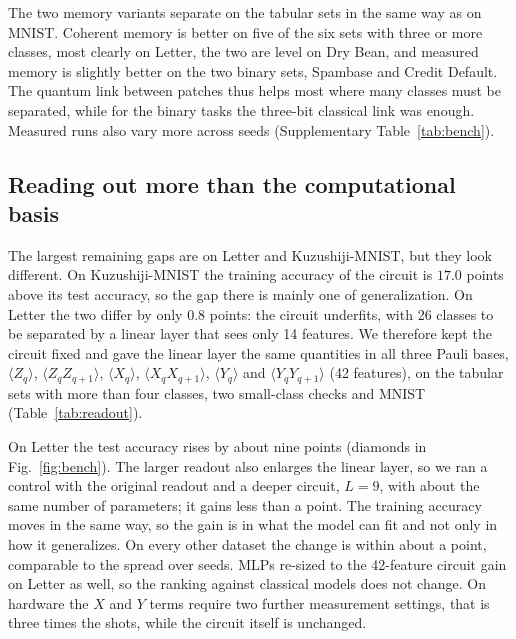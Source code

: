 \documentclass[11pt]{article}
\begin{document}
The two memory variants separate on the tabular sets in the same way as on MNIST. Coherent memory is better on five of the six sets with three or more classes, most clearly on Letter, the two are level on Dry Bean, and measured memory is slightly better on the two binary sets, Spambase and Credit Default. The quantum link between patches thus helps most where many classes must be separated, while for the binary tasks the three-bit classical link was enough. Measured runs also vary more across seeds (Supplementary Table~\ref{tab:bench}).

\subsection{Reading out more than the computational basis}
\label{sec:res-readout}

The largest remaining gaps are on Letter and Kuzushiji-MNIST, but they look different. On Kuzushiji-MNIST the training accuracy of the circuit is $17.0$ points above its test accuracy, so the gap there is mainly one of generalization. On Letter the two differ by only $0.8$ points: the circuit underfits, with 26 classes to be separated by a linear layer that sees only 14 features. We therefore kept the circuit fixed and gave the linear layer the same quantities in all three Pauli bases, $\langle Z_q\rangle$, $\langle Z_qZ_{q+1}\rangle$, $\langle X_q\rangle$, $\langle X_qX_{q+1}\rangle$, $\langle Y_q\rangle$ and $\langle Y_qY_{q+1}\rangle$ (42 features), on the tabular sets with more than four classes, two small-class checks and MNIST (Table~\ref{tab:readout}).

On Letter the test accuracy rises by about nine points (diamonds in Fig.~\ref{fig:bench}). The larger readout also enlarges the linear layer, so we ran a control with the original readout and a deeper circuit, $L=9$, with about the same number of parameters; it gains less than a point. The training accuracy moves in the same way, so the gain is in what the model can fit and not only in how it generalizes. On every other dataset the change is within about a point, comparable to the spread over seeds. MLPs re-sized to the 42-feature circuit gain on Letter as well, so the ranking against classical models does not change. On hardware the $X$ and $Y$ terms require two further measurement settings, that is three times the shots, while the circuit itself is unchanged.

\begin{table}[t]
  \centering
  \caption{Readout in three Pauli bases. Test accuracy (\%), mean $\pm$ standard deviation over three seeds, parameters in brackets; circuit with coherent memory and $L=4$. The MLP is re-sized to the parameter count of the 42-feature circuit. The best mean of each row is in bold. Control: $Z$, $ZZ$ readout with $L=9$ (1\,869 parameters): $71.8\pm2.1$ on Letter (Supplementary Table~\ref{tab:letter}).}
  \label{tab:readout}
  \footnotesize
  
\end{table}
\end{document}
